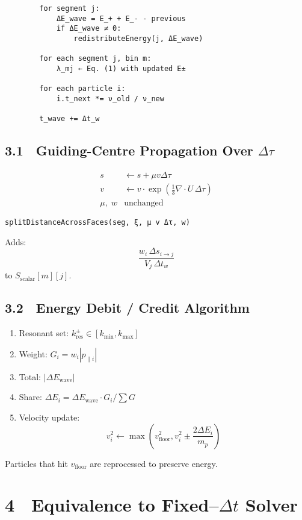 {\begin{lstlisting}
        for segment j:
            ΔE_wave = E_+ + E_- - previous
            if ΔE_wave ≠ 0:
                redistributeEnergy(j, ΔE_wave)

        for each segment j, bin m:
            λ_mj ← Eq. (1) with updated E±

        for each particle i:
            i.t_next *= ν_old / ν_new

        t_wave += Δt_w
\end{lstlisting}

\subsection*{3.1 Guiding-Centre Propagation Over $\Delta \tau$}

\[
\begin{aligned}
s &\gets s + \mu v \Delta \tau \\
v &\gets v \cdot \exp\left(\tfrac{1}{3} \nabla \cdot U \, \Delta \tau \right) \\
\mu,\;w &\text{unchanged}
\end{aligned}
\]

\begin{lstlisting}
splitDistanceAcrossFaces(seg, ξ, μ v Δτ, w)
\end{lstlisting}

Adds:
\[
\frac{w_i\,\Delta s_{i \to j}}{V_j\,\Delta t_w}
\]
to $S_{\text{scalar}}[m][j]$.

\subsection*{3.2 Energy Debit / Credit Algorithm}

\begin{enumerate}
\item Resonant set: $k^{\pm}_{\text{res}} \in [k_{\min}, k_{\max}]$
\item Weight: $G_i = w_i |p_{\parallel i}|$
\item Total: $|\Delta E_{\text{wave}}|$
\item Share: $\Delta E_i = \Delta E_{\text{wave}} \cdot G_i / \sum G$
\item Velocity update:
\[
v_i^2 \gets \max\left(v_{\text{floor}}^2, v_i^2 \pm \frac{2 \Delta E_i}{m_p} \right)
\]
\end{enumerate}

Particles that hit $v_{\text{floor}}$ are reprocessed to preserve energy.

\section*{4 Equivalence to Fixed–$\Delta t$ Solver}

}
